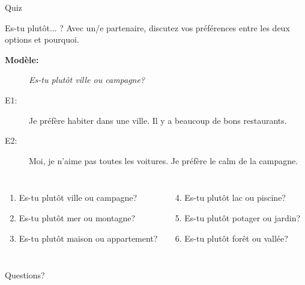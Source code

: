\documentclass{beamer}
\begin{document}
  \begin{frame}{}
    \begin{center}
      \Large Quiz
    \end{center}
  \end{frame}

  \begin{frame}{Es-tu plutôt... ?}
    Avec un/e partenaire, discutez vos préférences entre les deux options et pourquoi.
    \begin{description}
      \item[\textbf{Modèle:}] \textit{Es-tu plutôt ville ou campagne?}
      \item[E1:] Je préfère habiter dans une ville. Il y a beaucoup de bons restaurants.
      \item[E2:] Moi, je n'aime pas toutes les voitures. Je préfère le calm de la campagne.
    \end{description}
    \begin{columns}[t]
        \begin{enumerate}
          \item Es-tu plutôt ville ou campagne?
          \item Es-tu plutôt mer ou montagne?
          \item Es-tu plutôt maison ou appartement?
        \end{enumerate}
        \begin{enumerate}
          \setcounter{enumi}{3}
          \item Es-tu plutôt lac ou piscine?
          \item Es-tu plutôt potager ou jardin?
          \item Es-tu plutôt forêt ou vallée?
        \end{enumerate}
    \end{columns}
  \end{frame}

  \begin{frame}{}
    \begin{center}
      \Large Questions?
    \end{center}
  \end{frame}
\end{document}
